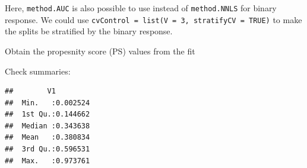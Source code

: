 \documentclass[
]{book}
\newenvironment{Shaded}{\begin{snugshade}}{\end{snugshade}}
\newcommand{\AttributeTok}[1]{\textcolor[rgb]{0.77,0.63,0.00}{#1}}
\newcommand{\DecValTok}[1]{\textcolor[rgb]{0.00,0.00,0.81}{#1}}
\newcommand{\FunctionTok}[1]{\textcolor[rgb]{0.00,0.00,0.00}{#1}}
\newcommand{\NormalTok}[1]{#1}
\newcommand{\OtherTok}[1]{\textcolor[rgb]{0.56,0.35,0.01}{#1}}
\newcommand{\SpecialCharTok}[1]{\textcolor[rgb]{0.00,0.00,0.00}{#1}}
\newcommand{\StringTok}[1]{\textcolor[rgb]{0.31,0.60,0.02}{#1}}
\begin{document}
\begin{Shaded}
\end{Shaded}

Here, \texttt{method.AUC} is also possible to use instead of \texttt{method.NNLS} for binary response. We could use \texttt{cvControl\ =\ list(V\ =\ 3,\ stratifyCV\ =\ TRUE)} to make the splits be stratified by the binary response.

Obtain the propesnity score (PS) values from the fit

\begin{Shaded}
\end{Shaded}

Check summaries:

\begin{Shaded}
\end{Shaded}

\begin{verbatim}
##        V1          
##  Min.   :0.002524  
##  1st Qu.:0.144662  
##  Median :0.343638  
##  Mean   :0.380834  
##  3rd Qu.:0.596531  
##  Max.   :0.973761
\end{verbatim}
\end{document}
